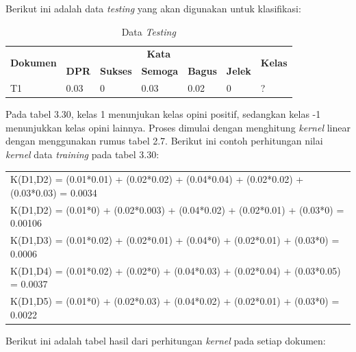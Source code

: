 \noindent Berikut ini adalah data \textit{testing }yang akan digunakan untuk klasifikasi:

\begin{table}[H]
	\caption{Data \textit{Testing}}
	\centering
	\small
	\begin{adjustbox}{width=1\textwidth}
	\begin{tabular}{|p{2.5cm}|p{1.5cm}|p{1.5cm}|p{1.5cm}|p{1.5cm}|p{1.5cm}|p{1cm}|}
		\hline
		\multirow{2}{*}{\textbf{Dokumen}} & \multicolumn{5}{c|}{\textbf{Kata}}& \multirow{2}{*}{\textbf{Kelas}}\\
		\cline{2-6}
		& \textbf{DPR} & \textbf{Sukses} & \textbf{Semoga} & \textbf{Bagus} & \textbf{Jelek} & \\
		\hline
		T1 & 0.03 & 0 & 0.03 & 0.02 & 0 & ?\\
		\hline
	\end{tabular}
	\end{adjustbox}
\end{table}
Pada tabel 3.30, kelas 1 menunjukan kelas opini positif, sedangkan kelas -1 menunjukkan kelas opini lainnya. Proses dimulai dengan menghitung \textit{kernel} linear dengan menggunakan rumus tabel 2.7. Berikut ini contoh perhitungan nilai \textit{kernel} data \textit{training }pada tabel 3.30:
\begin{table}[H]
	\centering
	\small
	\begin{adjustbox}{width=1\textwidth}
	\begin{tabular}{|p{13.55cm}|}
		\hline
		K(D1,D2) = (0.01*0.01) + (0.02*0.02) + (0.04*0.04) + (0.02*0.02) + 
		(0.03*0.03) = 0.0034\\
		K(D1,D2) = (0.01*0) + (0.02*0.003) + (0.04*0.02) + (0.02*0.01) + (0.03*0) = 0.00106\\
		K(D1,D3) = (0.01*0.02) + (0.02*0.01) + (0.04*0) + (0.02*0.01) + (0.03*0) = 0.0006\\
		K(D1,D4) = (0.01*0.02) + (0.02*0) + (0.04*0.03) + (0.02*0.04) + (0.03*0.05) = 0.0037\\
		K(D1,D5) = (0.01*0) + (0.02*0.03) + (0.04*0.02) + (0.02*0.01) + (0.03*0) = 0.0022 
		\\
		\hline
	\end{tabular}
	\end{adjustbox}
\end{table}
\noindent Berikut ini adalah tabel hasil dari perhitungan \textit{kernel} pada setiap dokumen:
